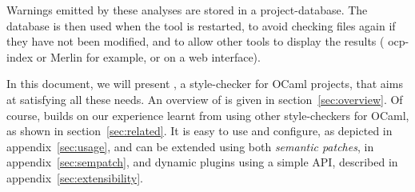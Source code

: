 Warnings emitted by these analyses are stored in a
project-database. The database is then used when the tool is
restarted, to avoid checking files again if they have not been
modified, and to allow other tools to display the results ({\sf
ocp-index} or {\sf Merlin} for example, or on a web interface).

In this document, we will present \ocplint{}, a style-checker for OCaml
projects, that aims at satisfying all these needs. An overview of
\ocplint{} is given in section~\ref{sec:overview}. Of course,
\ocplint{} builds on our experience learnt from using other
style-checkers for OCaml, as shown in section~\ref{sec:related}. It is
easy to use and configure, as depicted in appendix~\ref{sec:usage}, and
can be extended using both \emph{semantic patches}, in
appendix~\ref{sec:sempatch}, and dynamic plugins using a simple API,
described in appendix~\ref{sec:extensibility}.